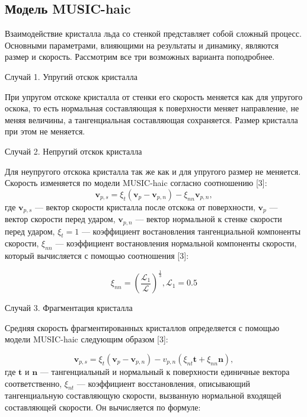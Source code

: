 \subsection{Модель MUSIC-haic}

Взаимодействие кристалла льда со стенкой представляет собой сложный процесс. Основными параметрами, влияющими на результаты и динамику, являются размер и скорость. Рассмотрим все три возможных варианта поподробнее.

\noindent Случай 1. Упругий отскок кристалла

При упругом отскоке кристалла от стенки его скорость меняется как для упругого оскока, то есть нормальная составляющая к поверхности меняет направление, не меняя величины, а тангенциальная составляющая сохраняется. Размер кристалла при этом не меняется.

\noindent Случай 2. Непругий отскок кристалла

Для неупругого отскока кристалла так же как и для упругого размер не меняется. Скорость изменяется по модели MUSIC-haic согласно соотношению [3]:
\begin{equation}
	\mathbf{v}_{p,s}=\xi_t (\mathbf{v}_p - \mathbf{v}_{p,n})-\xi_{nn} \mathbf{v}_{p,n},
\end{equation}
где $\mathbf{v}_{p,s}$ --- вектор скорости кристалла после отскока от поверхности, $\mathbf{v}_p$ --- вектор скорости перед ударом, $\mathbf{v}_{p,n}$ --- вектор нормальной к стенке скорости перед ударом, $\xi_{t} = 1$ --- коэффициент востановления тангенциальной компоненты скорости, $\xi_{nn}$ --- коэффициент востановления нормальной компоненты скорости, который вычисляется с помощью соотношения [3]:

\begin{equation}
	\xi_{nn} = \left(\frac{\mathcal{L}_1}{\mathcal{L}}\right)^{\frac{1}{3}},  \mathcal{L}_1 = 0.5
\end{equation}

\noindent Случай 3. Фрагментация кристалла 

Средняя скорость фрагментированных кристаллов определяется с помощью модели MUSIC-haic следующим образом [3]:

\begin{equation}
	\mathbf{v}_{p,s}=\xi_t (\mathbf{v}_p - \mathbf{v}_{p,n})-v_{p,n} (\xi_{nt} \mathbf{t}+\xi_{nn} \mathbf{n}),
\end{equation}
где $\mathbf{t}$ и $\mathbf{n}$ --- тангенциальный и нормальный к поверхности единичные вектора соответственно, $\xi_{nt}$ --- коэффициент восстановления, описывающий тангенциальную составляющую скорости, вызванную нормальной входящей составляющей скорости. Он вычисляется по формуле:

